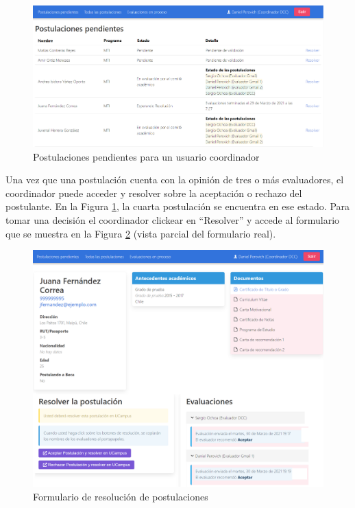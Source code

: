 \begin{figure}[!ht]
    \begin{center}
        \includegraphics[scale=0.23]{imagenes/04-pendientes-coordinador.png}
    \end{center}
    \caption{Postulaciones pendientes para un usuario coordinador}
    \label{fig:pendientes-coordinador}
\end{figure}

Una vez que una postulación cuenta con la opinión de tres o más evaluadores, el
coordinador puede acceder y resolver sobre la aceptación o rechazo del
postulante. En la Figura \ref{fig:pendientes-coordinador}, la cuarta postulación
se encuentra en ese estado. Para tomar una decisión el coordinador clickear en
“Resolver” y accede al formulario que se muestra en la Figura
\ref{fig:resolucion} (vista parcial del formulario real).

\begin{figure}[!ht]
    \begin{center}
        \includegraphics[scale=0.23]{imagenes/04-resolucion.png}
    \end{center}
    \caption{Formulario de resolución de postulaciones}
    \label{fig:resolucion}
\end{figure}

